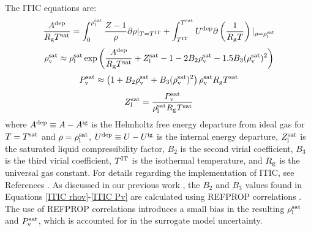 \documentclass[preprint,letterpaper,floatfix,citeautoscript,aip,jcp]{revtex4-1}
\begin{document}
The 
ITIC equations are: 
\begin{equation} \label{ITIC A}
\frac{A^{\rm dep}}{R_{\rm g}T^{\rm sat}} = \int_{0}^{\rho_{\rm l}^{\rm sat}}\frac{Z-1}{\rho} \partial \rho |_{T = T^{\rm IT}} + \int_{T^{\rm IT}}^{T^{\rm sat}}U^{\rm dep}\partial\left(\frac{1}{R_{\rm g}T}\right)|_{\rho=\rho_{\rm l}^{\rm sat}}
\end{equation}
\begin{equation} \label{ITIC rhov}
\rho_{\rm v}^{\rm sat} \approx \rho_{\rm l}^{\rm sat} \exp \left( \frac{A^{\rm dep}}{R_{\rm g}T^{\rm sat}} + Z_{\rm l}^{\rm sat} - 1 - 2 B_2 \rho_{\rm v}^{\rm sat} - 1.5 B_3 (\rho_{\rm v}^{\rm sat})^2 \right)
\end{equation}
\begin{equation} \label{ITIC Pv}
P_{\rm v}^{\rm sat} \approx \left(1 + B_2 \rho_{\rm v}^{\rm sat} + B_3 (\rho_{\rm v}^{\rm sat})^2\right)\rho_{\rm v}^{\rm sat} R_{\rm g}T^{\rm sat}
\end{equation}
\begin{equation} \label{ITIC Zl}
Z_{\rm l}^{\rm sat} = \frac{P_{\rm v}^{\rm sat}}{\rho_{\rm l}^{\rm sat} R_{\rm g} T^{\rm sat}}
\end{equation}
where $A^{\rm dep} \equiv A-A^{\rm ig}$ is the Helmholtz free energy departure from ideal gas for $T = T^{\rm sat}$ and $\rho = \rho_{\rm l}^{\rm sat}$, $U^{\rm dep} \equiv U-U^{\rm ig}$ is the internal energy departure, $Z_{\rm l}^{\rm sat}$ is the saturated liquid compressibility factor, $B_2$ is the second virial coefficient, $B_3$ is the third virial coefficient, $T^{\rm IT}$ is the isothermal temperature, and $R_{\rm g}$ is the universal gas constant. For details regarding the implementation of ITIC, see References . As discussed in our previous work \cite{Postdoc_1}, the $B_2$ and $B_3$ values found in Equations \ref{ITIC rhov}-\ref{ITIC Pv} are calculated using REFPROP correlations \cite{LEMMON-RP91}. The use of REFPROP correlations introduces a small bias in the resulting $\rho_{\rm l}^{\rm sat}$ and $P_{\rm v}^{\rm sat}$, which is accounted for in the surrogate model uncertainty.
\end{document}
